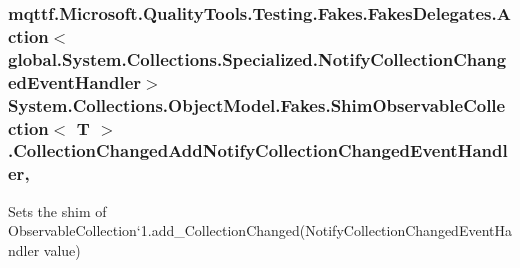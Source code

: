 \hypertarget{class_system_1_1_collections_1_1_object_model_1_1_fakes_1_1_shim_observable_collection_3_01_t_01_4_ac6ac32cc92cbe483da5ceebe58baa862}{
\subsubsection[{Collection\-Changed\-Add\-Notify\-Collection\-Changed\-Event\-Handler}]{\setlength{\rightskip}{0pt plus 5cm}mqttf.\-Microsoft.\-Quality\-Tools.\-Testing.\-Fakes.\-Fakes\-Delegates.\-Action$<$global.\-System.\-Collections.\-Specialized.\-Notify\-Collection\-Changed\-Event\-Handler$>$ System.\-Collections.\-Object\-Model.\-Fakes.\-Shim\-Observable\-Collection$<$ T $>$.Collection\-Changed\-Add\-Notify\-Collection\-Changed\-Event\-Handler\hspace{0.3cm}{\ttfamily [set]}, {\ttfamily [add]}}}\label{class_system_1_1_collections_1_1_object_model_1_1_fakes_1_1_shim_observable_collection_3_01_t_01_4_ac6ac32cc92cbe483da5ceebe58baa862}


Sets the shim of Observable\-Collection`1.add\-\_\-\-Collection\-Changed(\-Notify\-Collection\-Changed\-Event\-Handler value)

